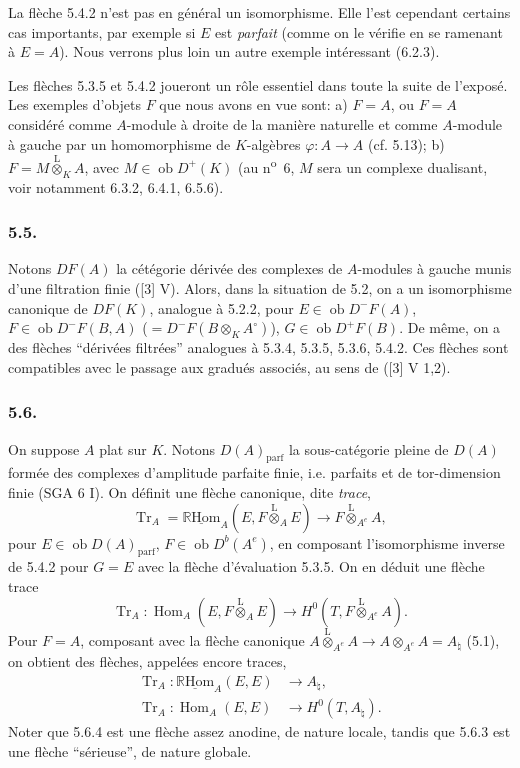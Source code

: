 \documentclass[11pt]{article}
\DeclareMathOperator{\Hom}{Hom}
\newcommand{\R}{\mathbb{R}}\newcommand{\RHomCore}{\mathbb{R}\mathrm{Hom}}
\newcommand{\ob}{\operatorname{ob}}
\providecommand{\RHom}{\RHomCore}
\providecommand{\uRHom}{\underline{\RHom}}
\providecommand{\Tr}{\operatorname{Tr}}
\providecommand{\Tr}{\operatorname{Tr}}
\providecommand{\lten}{\overset{\mathrm L}{\otimes}}
\providecommand{\Tr}{\operatorname{Tr}}
\providecommand{\RHom}{\RHomCore}
\providecommand{\Hom}{\operatorname{Hom}}
\providecommand{\ob}{\operatorname{ob}}
\providecommand{\lten}{\overset{\mathrm L}{\otimes}}
\providecommand{\RHom}{\R\mathcal{H}om}
\providecommand{\lten}{\overset{\mathrm L}{\otimes}}
\providecommand{\R}{\mathrm R}
\providecommand{\Tr}{\operatorname{Tr}}
\providecommand{\lten}{\overset{\mathrm L}{\otimes}}
\providecommand{\lten}{\overset{\mathrm L}{\otimes}}
\providecommand{\lten}{\overset{\mathrm L}{\otimes}}
\providecommand{\RHom}{\RHomCore}
\providecommand{\Hom}{\operatorname{Hom}}
\providecommand{\Tr}{\operatorname{Tr}}
\providecommand{\lten}{\overset{\mathrm L}{\otimes}}
\begin{document}
La flèche 5.4.2 n'est pas en général un isomorphisme. Elle l'est cependant certains cas importants, par exemple si $E$ est \emph{parfait} (comme on le vérifie en se ramenant à $E=A$). Nous verrons plus loin un autre exemple intéressant (6.2.3).

Les flèches 5.3.5 et 5.4.2 joueront un rôle essentiel dans toute la suite de l'exposé. Les exemples d'objets $F$ que nous avons en vue sont: a) $F=A$, ou $F=A$ considéré comme $A$-module à droite de la manière naturelle et comme $A$-module à gauche par un homomorphisme de $K$-algèbres $\varphi:A\to A$ (cf. 5.13); b) $F=M\lten_KA$, avec $M\in\ob D^+(K)$ (au n\textsuperscript{o}~6, $M$ sera un complexe dualisant, voir notamment 6.3.2, 6.4.1, 6.5.6).

\subsubsection*{5.5.}

Notons $DF(A)$ la cétégorie dérivée des complexes de $A$-modules à gauche munis d'une filtration finie ([3] V). Alors, dans la situation de 5.2, on a un isomorphisme canonique de $DF(K)$, analogue à 5.2.2, pour $E\in\ob D^-F(A)$, $F\in\ob D^-F(B,A)$ ($=D^-F(B\otimes_KA^\circ)$), $G\in\ob D^+F(B)$. De même, on a des flèches ``dérivées filtrées'' analogues à 5.3.4, 5.3.5, 5.3.6, 5.4.2. Ces flèches sont compatibles avec le passage aux gradués associés, au sens de ([3] V 1,2).

\subsubsection*{5.6.}

On suppose $A$ plat sur $K$. Notons $D(A)_{\mathrm{parf}}$ la sous-catégorie pleine de $D(A)$ formée des complexes d'amplitude parfaite finie, i.e. parfaits et de tor-dimension finie (SGA 6 I). On définit une flèche canonique, dite \emph{trace},
\begin{equation}\tag{5.6.1}
\Tr_A=\uRHom_A(E,F\lten_AE)\longrightarrow F\lten_{A^e}A,
\end{equation}
pour $E\in\ob D(A)_{\mathrm{parf}}$, $F\in\ob D^b(A^e)$, en composant l'isomorphisme inverse de 5.4.2 pour $G=E$ avec la flèche d'évaluation 5.3.5. On en déduit une flèche trace
\begin{equation}\tag{5.6.2}
\Tr_A:\Hom_A(E,F\lten_AE)\longrightarrow H^0(T,F\lten_{A^e}A).
\end{equation}
Pour $F=A$, composant avec la flèche canonique $A\lten_{A^e}A\to A\otimes_{A^e}A=A_\natural$ (5.1), on obtient des flèches, appelées encore traces,
\begin{align}
\Tr_A:\uRHom_A(E,E)&\longrightarrow A_\natural,\tag{5.6.3}\\
\Tr_A:\Hom_A(E,E)&\longrightarrow H^0(T,A_\natural).\tag{5.6.4}
\end{align}
Noter que 5.6.4 est une flèche assez anodine, de nature locale, tandis que 5.6.3 est une flèche ``sérieuse'', de nature globale.
\end{document}
